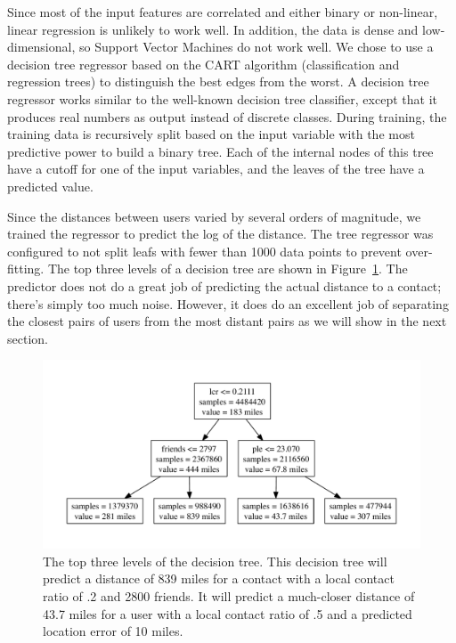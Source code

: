 \documentclass[letterpaper]{article}
\begin{document}
Since most of the input features are correlated and either binary or non-linear,
linear regression is unlikely to work well. In addition, the data is dense and low-dimensional, so Support Vector Machines
do not work well.  We chose to use a decision tree regressor based on the CART algorithm (classification and regression trees) to distinguish the best edges from the worst. A decision tree regressor works similar to the well-known decision tree classifier, except that it produces real numbers as output instead of discrete classes. During training, the training data is recursively split based on the input
variable with the most predictive power to build a binary tree.  Each of the internal nodes of this tree have a cutoff for one of the input
variables, and the leaves of the tree have a predicted value.

Since the distances between users varied by several orders of magnitude, we
trained the regressor to predict the log of the distance.
%
The tree regressor was configured to not split leafs with fewer than 1000 data
points to prevent over-fitting.
%
The top three levels of a decision tree are shown in Figure~\ref{fig:TreeTop}.
%
The predictor does not do a great job of predicting the actual distance to a
contact; there's simply too much noise.
%
However, it does do an excellent job of separating the closest pairs of users
from the most distant pairs as we will show in the next section.

\begin{figure}[tbh]
\centering
\includegraphics[width=\linewidth]{figures/tree_top.pdf}
\caption{
    The top three levels of the decision tree. This decision tree will predict a
    distance of 839 miles for a contact with a local contact ratio of .2 and
    2800 friends. It will predict a much-closer distance of 43.7 miles for a
    user with a local contact ratio of .5 and a predicted location error of 10
    miles.
}
\label{fig:TreeTop}
\end{figure}
\end{document}
